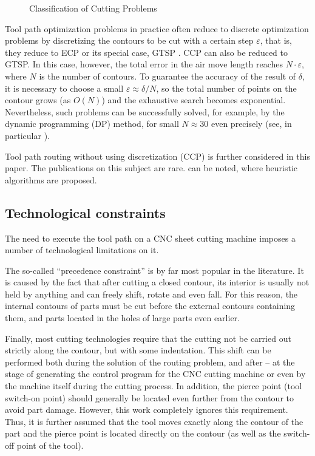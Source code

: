 \documentclass[]{llncs}
\begin{document}
\begin{figure}
  \centering
  \def\svgwidth{\columnwidth}
  
  \caption{Classification of Cutting Problems}
  \label{CP-classes}
\end{figure}

Tool path optimization problems
in practice often reduce to discrete optimization problems
by discretizing the contours to be cut with a certain step
$\varepsilon$,
that is, they reduce to ECP
\cite{bi04,bi05,bi06}
or its special case, GTSP
\cite{bi07,bi08,bi09,bi10}.
CCP can also be reduced to GTSP.
In this case, however,
the total error in the air move length reaches
$N \cdot \varepsilon$,
where $N$ is the number of contours.
To guarantee the accuracy of the result of
$\delta$,
it is necessary to choose a small
$\varepsilon \approx \delta / N$,
so the total number of points on the contour grows
(as $O (N)$)
and the exhaustive search becomes exponential.
Nevertheless, such problems can be successfully solved,
for example, by the dynamic programming
(DP)
method,
for small
$N \approx 30$ even precisely
(see, in particular \cite{bi15}).

Tool path routing without using discretization (CCP)
is further considered in this paper.
The publications on this subject
are rare.
\cite{bi11,bi12}
can be noted,
where
heuristic algorithms are proposed.

\subsection{Technological constraints}

The need to execute the tool path on a
CNC sheet cutting machine imposes
a number of technological limitations on it.

The so-called ``precedence constraint''
is by far most popular in the literature.
It is caused by the fact that after cutting a closed contour,
its interior is usually not held by anything
and can freely shift, rotate and even fall.
For this reason,
the internal contours of parts must be cut
before the external contours containing them,
and parts located in the holes of large parts even earlier.

Finally, most cutting technologies require
that the cutting not be carried out strictly along the contour,
but with some indentation.
This shift can be performed both during the solution of the routing problem,
and after -- at the stage of generating the control program for the CNC cutting machine
or even by the machine itself during the cutting process.
In addition, the pierce point (tool switch-on point)
should generally be located even further
from the contour to avoid part damage.
However, this work completely ignores this requirement.
Thus, it is further assumed that the tool moves exactly
along the contour of the part
and the pierce point is located directly on the contour
(as well as the switch-off point of the tool).
\end{document}

